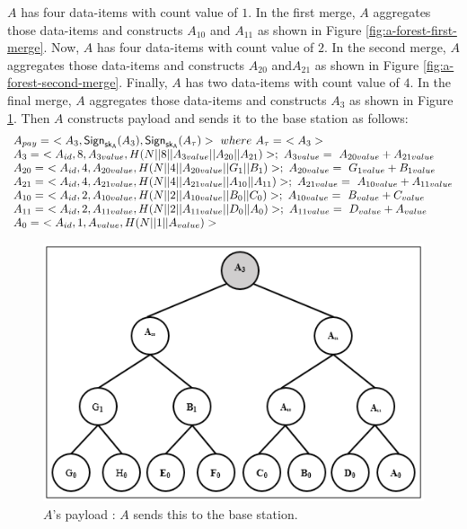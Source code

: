 	$A$ has four data-items with count value of $1$.
	In the first merge, $A$ aggregates those data-items and constructs $A_{10}$ and $A_{11}$ as shown in Figure \ref{fig:a-forest-first-merge}.
	Now, $A$ has four data-items with count value of $2$.
	In the second merge, $A$ aggregates those data-items and constructs $A_{20}$ and$A_{21}$ as shown in Figure \ref{fig:a-forest-second-merge}.
	Finally, $A$ has two data-items with count value of $4$.
	In the final merge, $A$ aggregates those data-items and constructs $A_{3}$ as shown in Figure \ref{fig:a-payload}.
	Then $A$ constructs payload and sends it to the base station as follows:
		\begin{equation*}
			\begin{array}{l}
				A_{pay} =\ <A_{3},\textsf{Sign}_{\sk_{A}}(A_{3}),\textsf{Sign}_{\sk_{A}}(A_{\tau})>\ where\ A_{\tau} =\ <A_{3}>\\
				A_{3} =\ <A_{id}, 8, A_{3value}, H(N||8||A_{3value}||A_{20}||A_{21})>;\ A_{3value} =\ A_{20value} + A_{21value}\\
				A_{20} =\ <A_{id},4,A_{20value},H(N||4||A_{20value}||G_{1}||B_{1})>;\ A_{20value} =\ G_{1value} + B_{1value}\\ 
				A_{21} =\ <A_{id},4,A_{21value},H(N||4||A_{21value}||A_{10}||A_{11})>;\ A_{21value} =\ A_{10value} + A_{11value}\\ 
				A_{10} =\ <A_{id},2,A_{10value},H(N||2||A_{10value}||B_{0}||C_{0})>;\ A_{10value} =\ B_{value} + C_{value}\\
				A_{11} =\ <A_{id},2,A_{11value},H(N||2||A_{11value}||D_{0}||A_{0})>;\ A_{11value} =\ D_{value} + A_{value}\\
				A_{0} =\ <A_{id},1,A_{value},H(N||1||A_{value})>
			\end{array}
		\end{equation*}
	\begin{figure}[h!]
		\centering
		\includegraphics{images/a-payload.png}
		\caption{$A$'s payload : $A$ sends this to the base station.}
		\label{fig:a-payload}
	\end{figure}

